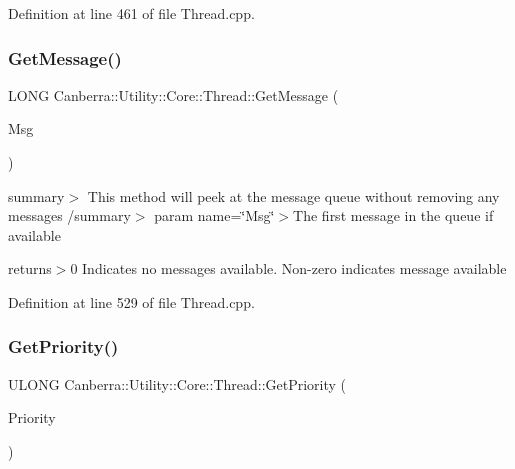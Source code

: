Definition at line 461 of file Thread.\+cpp.

\mbox{\label{class_canberra_1_1_utility_1_1_core_1_1_thread_aa68aa652462d9dd2d48a7c953611bb53_aa68aa652462d9dd2d48a7c953611bb53}} 
\subsubsection{\texorpdfstring{Get\+Message()}{GetMessage()}}
{\footnotesize\ttfamily L\+O\+NG Canberra\+::\+Utility\+::\+Core\+::\+Thread\+::\+Get\+Message (\begin{DoxyParamCaption}\item[{\hyperlink{struct___m_s_g}{M\+SG} $\ast$}]{Msg }\end{DoxyParamCaption})\hspace{0.3cm}{\ttfamily [protected]}}

summary$>$ This method will peek at the message queue without removing any messages /summary$>$ param name=\char`\"{}\+Msg\char`\"{}$>$The first message in the queue if available

returns$>$0 Indicates no messages available. Non-\/zero indicates message available

Definition at line 529 of file Thread.\+cpp.

\mbox{\label{class_canberra_1_1_utility_1_1_core_1_1_thread_a5673b33f5b74126886399feafd0c1c1b_a5673b33f5b74126886399feafd0c1c1b}} 
\subsubsection{\texorpdfstring{Get\+Priority()}{GetPriority()}}
{\footnotesize\ttfamily U\+L\+O\+NG Canberra\+::\+Utility\+::\+Core\+::\+Thread\+::\+Get\+Priority (\begin{DoxyParamCaption}\item[{L\+O\+NG \&}]{Priority }\end{DoxyParamCaption})}

